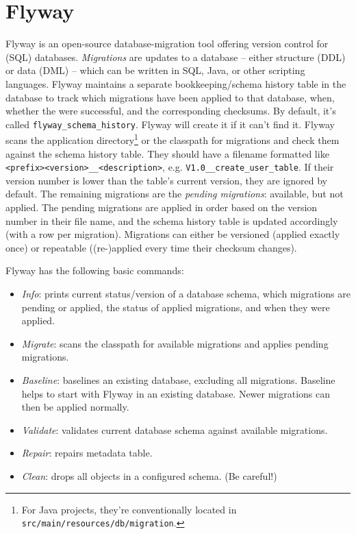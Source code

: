\documentclass[table, xcdraw]{article}%
\begin{document}
\section{Flyway}

Flyway is an open-source database-migration tool offering version control for (SQL) databases. \emph{Migrations} are updates to a database -- either structure (DDL) or data (DML) -- which can be written in SQL, Java, or other scripting languages. Flyway maintains a separate bookkeeping/schema history table in the database to track which migrations have been applied to that database, when, whether the were successful, and the corresponding checksums. By default, it's called \texttt{flyway_schema_history}. Flyway will create it if it can't find it. Flyway scans the application directory\footnote{For Java projects, they're conventionally located in \texttt{src/main/resources/db/migration}.} or the classpath for migrations and check them against the schema history table. They should have a filename formatted like \texttt{<prefix><version>__<description>}, e.g. \texttt{V1.0__create_user_table}. If their version number is lower than the table's current version, they are ignored by default. The remaining migrations are the \emph{pending migrations}: available, but not applied. The pending migrations are applied in order based on the version number in their file name, and the schema history table is updated accordingly (with a row per migration). Migrations can either be versioned (applied exactly once) or repeatable ((re-)applied every time their checksum changes).

Flyway has the following basic commands:

\begin{itemize}
    \item \textit{Info}: prints current status/version of a database schema, which migrations are pending or applied, the status of applied migrations, and when they were applied.
    \item \textit{Migrate}: scans the classpath for available migrations and applies pending migrations.
    \item \textit{Baseline}: baselines an existing database, excluding all migrations. Baseline helps to start with Flyway in an existing database. Newer migrations can then be applied normally.
    \item \textit{Validate}: validates current database schema against available migrations.
    \item \textit{Repair}: repairs metadata table.
    \item \textit{Clean}: drops all objects in a configured schema. (Be careful!)
\end{itemize}
\end{document}
